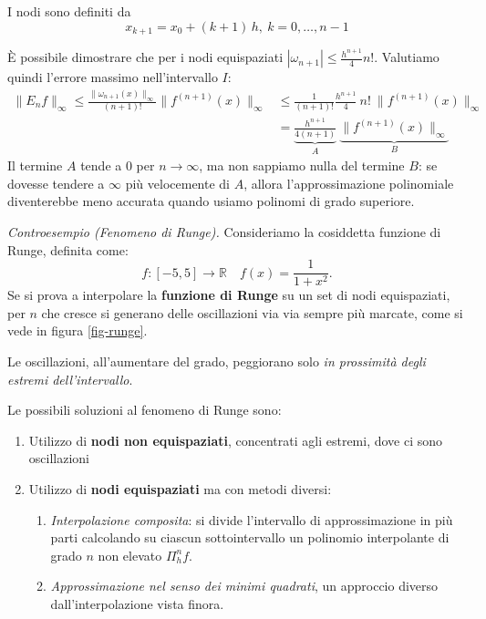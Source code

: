 I nodi sono definiti da 
\begin{equation*}
    x_{k+1}=x_0+(k+1)\,h,\ k=0,\dots,n-1
\end{equation*}

È possibile dimostrare che per i nodi equispaziati $|\omega_{n+1}|\le \frac{h^{n+1}} 4 n!$. Valutiamo quindi l'errore massimo nell'intervallo $I$:
\begin{align*}
    \|E_n f\|_\infty \le \frac{\|\omega_{n+1}(x)\|_\infty}{(n+1)!}\| f^{(n+1)}(x) \|_\infty&\le   \frac{1}{(n+1)!} \frac{h^{n+1}}{4}\ n!\ \| \!f^{(n+1)}(x) \|_\infty\\
    &=\underbrace{\frac{h^{n+1}}{4(n+1)}}_A \ \underbrace{\| \!f^{(n+1)}(x) \|_\infty}_B
\end{align*}
Il termine $A$ tende a $0$ per $n\to\infty$, ma non sappiamo nulla del termine $B$: se dovesse tendere a $\infty$ più velocemente di $A$, allora l'approssimazione polinomiale diventerebbe meno accurata quando usiamo polinomi di grado superiore.

\textit{Controesempio (Fenomeno di Runge).}
Consideriamo la cosiddetta funzione di Runge, definita come:
\begin{equation*}
f:[ -5,5]\rightarrow \mathbb{R} \quad f(x) =\frac{1}{1+x^{2}}.
\end{equation*}
Se si prova a interpolare la \textbf{funzione di Runge} su un set di nodi equispaziati, per $n$ che cresce si generano delle oscillazioni via via sempre più marcate, come si vede in figura \ref{fig-runge}.


Le oscillazioni, all'aumentare del grado, peggiorano solo \textit{in prossimità degli estremi dell'intervallo}.


 Le possibili soluzioni al fenomeno di Runge sono:
\begin{enumerate}
\item Utilizzo di \textbf{nodi non equispaziati}, concentrati agli estremi, dove ci sono oscillazioni
\item Utilizzo di \textbf{nodi equispaziati} ma con metodi diversi:
\begin{enumerate}
\item \textit{Interpolazione composita}: si divide l'intervallo di approssimazione in più parti calcolando su ciascun sottointervallo un polinomio interpolante di grado $n$ non elevato $\Pi ^{n}_{h} f$.
\item \textit{Approssimazione nel senso dei minimi quadrati}, un approccio diverso dall'interpolazione vista finora.
\end{enumerate}
\end{enumerate}
